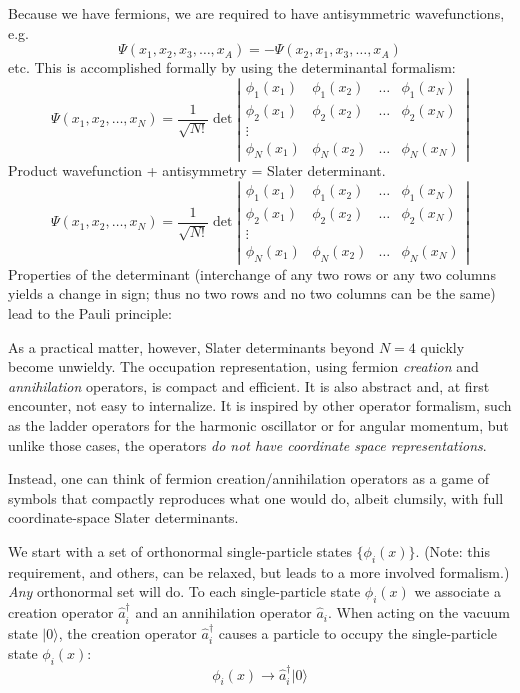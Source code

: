 Because we have fermions, we are required to have antisymmetric wavefunctions, e.g.
\[
\Psi(x_1, x_2, x_3, \ldots, x_A) = - \Psi(x_2, x_1, x_3, \ldots, x_A)
\]
etc. This is accomplished formally by using the determinantal formalism:
\[
\Psi(x_1, x_2, \ldots, x_N) 
= \frac{1}{\sqrt{N!}} 
\det \left | 
\begin{array}{cccc}
\phi_1(x_1) & \phi_1(x_2) & \ldots & \phi_1(x_N) \\
\phi_2(x_1) & \phi_2(x_2) & \ldots & \phi_2(x_N) \\
 \vdots & & &  \\
\phi_N(x_1) & \phi_N(x_2) & \ldots & \phi_N(x_N) 
\end{array}
\right |
\]
Product wavefunction + antisymmetry = Slater determinant. 
\[
\Psi(x_1, x_2, \ldots, x_N) 
= \frac{1}{\sqrt{N!}} 
\det \left | 
\begin{array}{cccc}
\phi_1(x_1) & \phi_1(x_2) & \ldots & \phi_1(x_N) \\
\phi_2(x_1) & \phi_2(x_2) & \ldots & \phi_2(x_N) \\
 \vdots & & &  \\
\phi_N(x_1) & \phi_N(x_2) & \ldots & \phi_N(x_N) 
\end{array}
\right |
\]
Properties of the determinant (interchange of any two rows or 
any two columns yields a change in sign; thus no two rows and no 
two columns can be the same) lead to the Pauli principle:

As a practical matter, however, Slater determinants beyond $N=4$ quickly become 
unwieldy. 
The occupation representation, using fermion \textit{creation} and \textit{annihilation} 
operators, is compact and efficient. It is also abstract and, at first encounter, not easy to 
internalize. It is inspired by other operator formalism, such as the ladder operators for 
the harmonic oscillator or for angular momentum, but unlike those cases, the operators 
\textit{do not have coordinate space representations}.

Instead, one can think of fermion creation/annihilation operators as a game of symbols that 
compactly reproduces what one would do, albeit clumsily, with full coordinate-space Slater 
determinants. 

We start with a set of orthonormal single-particle states $\{ \phi_i(x) \}$. 
(Note: this requirement, and others, can be relaxed, but leads to a 
more involved formalism.) \textit{Any} orthonormal set will do. 
To each single-particle state $\phi_i(x)$ we associate a creation operator 
$\hat{a}^\dagger_i$ and an annihilation operator $\hat{a}_i$. 
When acting on the vacuum state $| 0 \rangle$, the creation operator $\hat{a}^\dagger_i$ causes 
a particle to occupy the single-particle state $\phi_i(x)$:
\[
\phi_i(x) \rightarrow \hat{a}^\dagger_i |0 \rangle
\]

